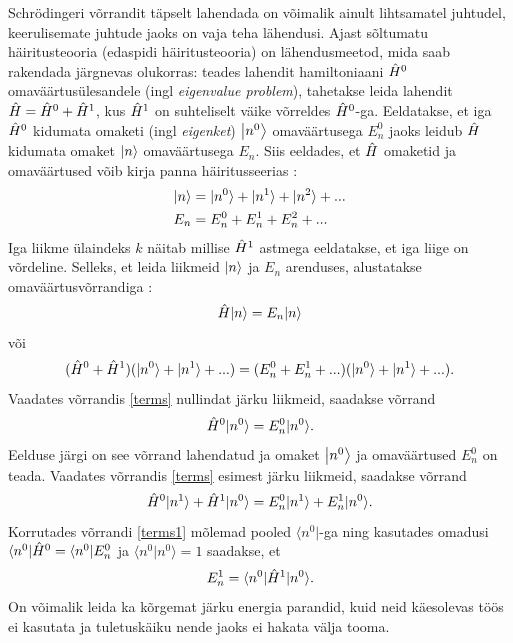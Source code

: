 \documentclass{trkut}%
\renewcommand\bra[1]{{\langle{#1}|}}
\renewcommand\ket[1]{{|{#1}\rangle}}
\renewcommand\Ket[1]{\mleft|#1\mright\rangle}
\renewcommand\braket[1]{\langle{#1}\rangle}
\begin{document}
Schrödingeri võrrandit täpselt lahendada on võimalik ainult lihtsamatel juhtudel, keerulisemate juhtude jaoks on vaja teha lähendusi.
Ajast sõltumatu häiritusteooria (edaspidi häiritusteooria) on lähendusmeetod, mida saab rakendada järgnevas olukorras: teades lahendit hamiltoniaani $\op[0]{H}$ omaväärtusülesandele (ingl \textit{eigenvalue problem}), tahetakse leida lahendit $\op{H}=\op[0]{H}+\op[1]{H}$, kus $\op[1]{H}$ on suhteliselt väike võrreldes $\op[0]{H}$-ga.
Eeldatakse, et iga $\op[0]{H}$ kidumata omaketi (ingl \textit{eigenket}) $\Ket{n^0}$ omaväärtusega $E_n^0$ jaoks leidub $\op{H}$ kidumata omaket $\Ket{n}$ omaväärtusega $E_n$.
Siis eeldades, et $\op{H}$ omaketid ja omaväärtused võib kirja panna häiritusseerias \parencite[451]{shankar94}:
\begin{align}
    \Ket{n}&=\ket{n^0}+\ket{n^1}+\ket{n^2}+... \\
    E_n&=E_n^0+E_n^1+E_n^2+...
\end{align}
Iga liikme ülaindeks $k$ näitab millise $\op[1]{H}$ astmega eeldatakse, et iga liige on võrdeline.
Selleks, et leida liikmeid $\Ket{n}$ ja $E_n$ arenduses, alustatakse omaväärtusvõrrandiga \parencite[451-452]{shankar94}:
\begin{equation}
    \op{H}\ket{n}=E_n\ket{n}
\end{equation}
või
\begin{equation}
    (\op[0]{H} + \op[1]{H})(\ket{n^0}+\ket{n^1}+...)=(E_n^0+E_n^1+...) (\ket{n^0}+\ket{n^1}+...).
    \label{terms}
\end{equation}
Vaadates võrrandis \eqref{terms} nullindat järku liikmeid, saadakse võrrand
\begin{equation}
    \op[0]{H}\ket{n^0}=E_n^0\ket{n^0}.
\end{equation}
Eelduse järgi on see võrrand lahendatud ja omaket $\Ket{n^0}$ ja omaväärtused $E_n^0$ on teada. Vaadates võrrandis \eqref{terms} esimest järku liikmeid, saadakse võrrand
\begin{equation}
    \op[0]{H}\ket{n^1} + \op[1]{H}\ket{n^0} = E_n^0\ket{n^1} + E_n^1\ket{n^0}.
    \label{terms1}
\end{equation}
Korrutades võrrandi \eqref{terms1} mõlemad pooled $\bra{n^0}$-ga ning kasutades omadusi $\bra{n^0}\op[0]{H}=\bra{n^0}E_n^0$ ja $\braket{n^0|n^0}=1$ saadakse, et
\begin{equation}
    E_n^1=\braket{n^0|\op[1]{H}|n^0}.
    \label{parand1}
\end{equation}
On võimalik leida ka kõrgemat järku energia parandid, kuid neid käesolevas töös ei kasutata ja tuletuskäiku nende jaoks ei hakata välja tooma.
\end{document}
